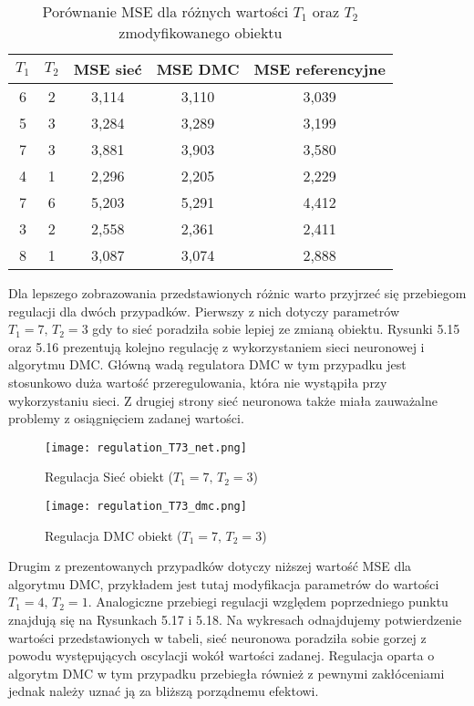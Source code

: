 \begin{table}[!htb] \label{tab:tabela4} \centering
\caption{Porównanie MSE dla różnych wartości \(T_1\) oraz \(T_2\) zmodyfikowanego obiektu}
\begin{tabular} {| c | c | c | c | c |} \hline
    \(T_1\) & \(T_2\) & MSE sieć & MSE DMC & MSE referencyjne  \\ \hline\hline
    6 & 2 & 3,114 & 3,110 & 3,039 \\ \hline
    5 & 3 & 3,284 & 3,289 & 3,199 \\ \hline
    7 & 3 & 3,881 & 3,903 & 3,580 \\ \hline
    4 & 1 & 2,296 & 2,205 & 2,229 \\ \hline
    7 & 6 & 5,203 & 5,291 & 4,412 \\ \hline
    3 & 2 & 2,558 & 2,361 & 2,411 \\ \hline
    8 & 1 & 3,087 & 3,074 & 2,888 \\ \hline
\end{tabular}
\end{table}

\par Dla lepszego zobrazowania przedstawionych różnic warto przyjrzeć się przebiegom regulacji dla dwóch przypadków. Pierwszy z nich dotyczy parametrów \( T_1=7, \, T_2=3 \) gdy to sieć poradziła sobie lepiej ze zmianą obiektu. Rysunki 5.15 oraz 5.16 prezentują kolejno regulację z wykorzystaniem sieci neuronowej i algorytmu DMC. Główną wadą regulatora DMC w tym przypadku jest stosunkowo duża wartość przeregulowania, która nie wystąpiła przy wykorzystaniu sieci. Z drugiej strony sieć neuronowa także miała zauważalne problemy z osiągnięciem zadanej wartości.

\begin{figure}[!htb]
\centering
\begin{minipage}{.5\textwidth}
  \label{fig:Regulation-T73-net}
  \centering \texttt{[image: regulation\_T73\_net.png]}
  \caption{Regulacja Sieć obiekt (\( T_1=7, \, T_2=3 \))}
  \label{fig:test1}
\end{minipage}%
\begin{minipage}{.5\textwidth}
  \label{fig:Regulation-T73-dmc}
  \centering \texttt{[image: regulation\_T73\_dmc.png]}
  \caption{Regulacja DMC obiekt (\( T_1=7, \, T_2=3 \))}
\end{minipage}
\end{figure}

\par Drugim z prezentowanych przypadków dotyczy niższej wartość MSE dla algorytmu DMC, przykładem jest tutaj modyfikacja parametrów do wartości \( T_1=4, \, T_2=1 \). Analogiczne przebiegi regulacji względem poprzedniego punktu znajdują się na Rysunkach 5.17 i 5.18. Na wykresach odnajdujemy potwierdzenie wartości przedstawionych w tabeli, sieć neuronowa poradziła sobie gorzej z powodu występujących oscylacji wokół wartości zadanej. Regulacja oparta o algorytm DMC w tym przypadku przebiegła również z pewnymi zakłóceniami jednak należy uznać ją za bliższą porządnemu efektowi. 

